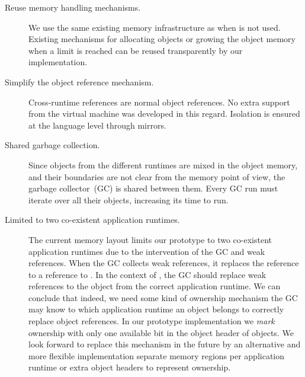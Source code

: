 \begin{description}
	\item[Reuse memory handling mechanisms.] We use the same existing memory infrastructure as when \Vtt is not used. Existing mechanisms for allocating objects or growing the object memory when a limit is reached can be reused transparently by our implementation. 
	\item[Simplify the object reference mechanism.] Cross-runtime references are normal object references. No extra support from the virtual machine was developed in this regard. Isolation is ensured at the language level through mirrors.
	\item[Shared garbage collection.] Since objects from the different runtimes are mixed in the object memory, and their boundaries are not clear from the memory point of view, the garbage collector~(GC) is shared between them. Every GC run must iterate over all their objects, increasing its time to run.
	\item[Limited to two co-existent application runtimes.] The current memory layout limits our prototype to two co-existent application runtimes due to the intervention of the GC and weak references. When the GC collects weak references, it replaces the reference to a reference to . In the context of \Vtt, the GC should replace weak references to the  object from the correct application runtime. We can conclude that indeed, we need some kind of ownership mechanism \ie the GC may know to which application runtime an object belongs to correctly replace object references. In our prototype implementation we \emph{mark} ownership with only one available bit in the object header of objects. We look forward to replace this mechanism in the future by an alternative and more flexible implementation \eg separate memory regions per application runtime or extra object headers to represent ownership.
\end{description}



